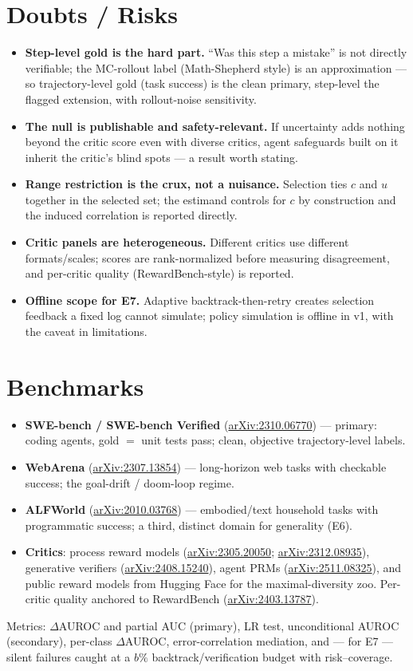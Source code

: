 \documentclass[11pt]{article}
\newcommand{\arxiv}[1]{\href{https://arxiv.org/abs/#1}{arXiv:#1}}
\begin{document}
\section{Doubts / Risks}
\begin{itemize}[leftmargin=1.2em,itemsep=2pt]
  \item \textbf{Step-level gold is the hard part.} ``Was this step a mistake'' is not
    directly verifiable; the MC-rollout label (Math-Shepherd style) is an
    approximation --- so trajectory-level gold (task success) is the clean primary,
    step-level the flagged extension, with rollout-noise sensitivity.
  \item \textbf{The null is publishable and safety-relevant.} If uncertainty adds
    nothing beyond the critic score even with diverse critics, agent safeguards
    built on it inherit the critic's blind spots --- a result worth stating.
  \item \textbf{Range restriction is the crux, not a nuisance.} Selection ties $c$
    and $u$ together in the selected set; the estimand controls for $c$ by
    construction and the induced correlation is reported directly.
  \item \textbf{Critic panels are heterogeneous.} Different critics use different
    formats/scales; scores are rank-normalized before measuring disagreement, and
    per-critic quality (RewardBench-style) is reported.
  \item \textbf{Offline scope for E7.} Adaptive backtrack-then-retry creates
    selection feedback a fixed log cannot simulate; policy simulation is offline in
    v1, with the caveat in limitations.
\end{itemize}

\section{Benchmarks}
\begin{itemize}[leftmargin=1.2em,itemsep=3pt]
  \item \textbf{SWE-bench / SWE-bench Verified} (\arxiv{2310.06770}) --- primary:
    coding agents, gold $=$ unit tests pass; clean, objective trajectory-level labels.
  \item \textbf{WebArena} (\arxiv{2307.13854}) --- long-horizon web tasks with
    checkable success; the goal-drift / doom-loop regime.
  \item \textbf{ALFWorld} (\arxiv{2010.03768}) --- embodied/text household tasks with
    programmatic success; a third, distinct domain for generality (E6).
  \item \textbf{Critics}: process reward models (\arxiv{2305.20050};
    \arxiv{2312.08935}), generative verifiers (\arxiv{2408.15240}), agent PRMs
    (\arxiv{2511.08325}), and public reward models from Hugging Face for the
    maximal-diversity zoo. Per-critic quality anchored to RewardBench (\arxiv{2403.13787}).
\end{itemize}
Metrics: $\Delta$AUROC and partial AUC (primary), LR test, unconditional AUROC
(secondary), per-class $\Delta$AUROC, error-correlation mediation, and --- for E7 ---
silent failures caught at a $b\%$ backtrack/verification budget with risk--coverage.
\end{document}

